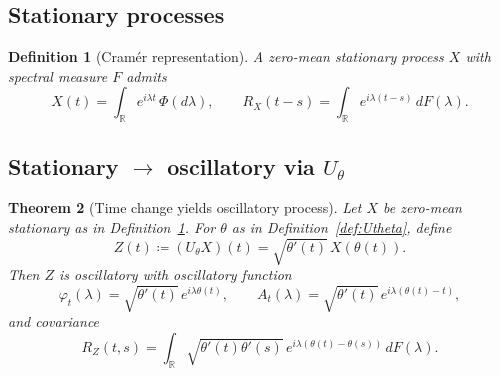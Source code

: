 \documentclass{article}
\newtheorem{theorem}{Theorem}[section]
\newtheorem{definition}[theorem]{Definition}
\begin{document}
\subsection{Stationary processes}
\begin{definition}[Cram\'er representation]\label{def:cramer}
A zero-mean stationary process $X$ with spectral measure $F$ admits
\[
X(t)=\int_{\mathbb{R}} e^{i\lambda t}\,\Phi(d\lambda),\qquad
R_X(t-s)=\int_{\mathbb{R}} e^{i\lambda(t-s)}\,dF(\lambda).
\]
\end{definition}

\subsection{Stationary $\to$ oscillatory via $U_\theta$}
\begin{theorem}[Time change yields oscillatory process]\label{thm:Utheta_to_osc}
Let $X$ be zero-mean stationary as in Definition~\ref{def:cramer}. For $\theta$ as in Definition~\ref{def:Utheta}, define
\[
Z(t)\coloneqq (U_\theta X)(t)=\sqrt{\theta'(t)}\,X(\theta(t)).
\]
Then $Z$ is oscillatory with oscillatory function
\[
\varphi_t(\lambda)=\sqrt{\theta'(t)}\,e^{i\lambda\theta(t)},
\qquad
A_t(\lambda)=\sqrt{\theta'(t)}\,e^{i\lambda(\theta(t)-t)},
\]
and covariance
\[
R_Z(t,s)=\int_{\mathbb{R}} \sqrt{\theta'(t)\theta'(s)}\,e^{i\lambda(\theta(t)-\theta(s))}\,dF(\lambda).
\]
\end{theorem}
\end{document}

